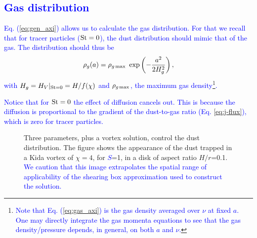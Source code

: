 \documentclass[apj]{emulateapj}
\def\blue#1{\textcolor{blue}{ #1}}
\newcommand{\Eq}[1]{Eq. (\ref{#1})}
\newcommand{\eq}[1]{\Eq{#1}}
\newcommand{\eqp}[1]{(Eq. \ref{#1})}
\newcommand{\beq}{\begin{equation}}
\newcommand{\eeq}{\end{equation}}
\newcommand{\St}{{\rm St}}
\begin{document}
\blue{\subsection{Gas distribution}}

\blue{\eq{eq:gen_axi} allows us to calculate the gas distribution. For
  that we recall that  for tracer particles ($\St=0$), the dust distribution should
  mimic that of the gas. The distribution should thus be 
\beq
\rho_g(a) = \rho_{g\,{\rm max}} \ \exp\left(-\frac{a^2}{2H_g^2}\right), \label{eq:gas_axi}
\eeq
\noindent with $H_g = {H_V}{\vert_{\St=0}} = H/f(\chi)$ and
$\rho_{g\,{\rm max}}$, the maximum gas density{\footnote{\blue{Note that 
\eq{eq:gas_axi} is the gas density averaged over $\nu$ at fixed $a$.  One may  
directly integrate the gas momenta equations to see that the gas
density/pressure depends, in general, on both $a$ and $\nu$.}}}. }

\blue{Notice that for $\St=0$ the effect of diffusion cancels out. This is because
the diffusion is proportional to the gradient of the dust-to-gas
ratio \eqp{eq:j-flux}, which is zero for tracer
particles.}



\begin{figure}
\begin{center}
 \end{center}
\caption[]{Three parameters, plus a vortex solution, control the dust distribution. 
The figure shows the appearance of the dust trapped in a Kida vortex of $\chi=4$, 
for \blue{$S$}=1, in a disk of aspect ratio $H/r$=0.1. \blue{We
  caution that this image extrapolates the spatial range of
  applicability of the shearing box approximation used to construct
  the solution.}}
 \label{fig:disk}
\end{figure}
\end{document}
